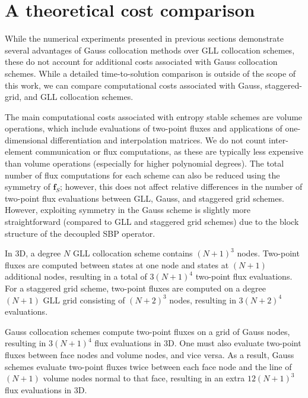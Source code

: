 \documentclass[onefignum,onetabnum,final]{siamart171218}
\begin{document}
\section{A theoretical cost comparison}

While the numerical experiments presented in previous sections demonstrate several advantages of Gauss collocation methods over GLL collocation schemes, these do not account for additional costs associated with Gauss collocation schemes.  While a detailed time-to-solution comparison is outside of the scope of this work, we can compare computational costs associated with Gauss, staggered-grid, and GLL collocation schemes.  

The main computational costs associated with entropy stable schemes are volume operations, which include evaluations of two-point fluxes and applications of one-dimensional differentiation and interpolation matrices.  We do not count inter-element communication or flux computations, as these are typically less expensive than volume operations (especially for higher polynomial degrees).  The total number of flux computations for each scheme can also be reduced using the symmetry of $\bm{f}_S$; however, this does not affect relative differences in the number of two-point flux evaluations between GLL, Gauss, and staggered grid schemes.  However, exploiting symmetry in the Gauss scheme is slightly more straightforward (compared to GLL and staggered grid schemes) due to the block structure of the decoupled SBP operator.

In 3D, a degree $N$ GLL collocation scheme contains $(N+1)^3$ nodes.  Two-point fluxes are computed between states at one node and states at $(N+1)$ additional nodes, resulting in a total of $3(N+1)^4$ two-point flux evaluations.  For a staggered grid scheme, two-point fluxes are computed on a degree $(N+1)$ GLL grid consisting of $(N+2)^3$ nodes, resulting in $3(N+2)^4$ evaluations.  

Gauss collocation schemes compute two-point fluxes on a grid of Gauss nodes, resulting in $3(N+1)^4$ flux evaluations in 3D.  One must also evaluate two-point fluxes between face nodes and volume nodes, and vice versa.  As a result, Gauss schemes evaluate two-point fluxes twice between each face node and the line of $(N+1)$ volume nodes normal to that face, resulting in an extra $12(N+1)^3$ flux evaluations in 3D.  %
\end{document}
